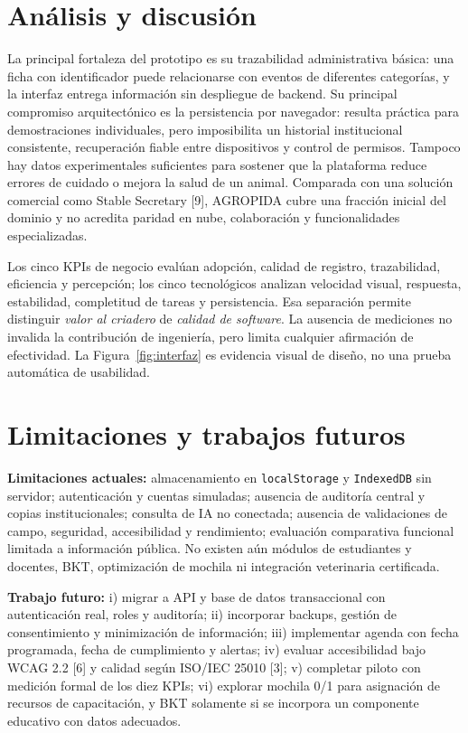 \documentclass[conference,10pt]{IEEEtran}
\begin{document}
\section{Análisis y discusión}
La principal fortaleza del prototipo es su trazabilidad administrativa básica: una ficha con identificador puede relacionarse con eventos de diferentes categorías, y la interfaz entrega información sin despliegue de backend. Su principal compromiso arquitectónico es la persistencia por navegador: resulta práctica para demostraciones individuales, pero imposibilita un historial institucional consistente, recuperación fiable entre dispositivos y control de permisos. Tampoco hay datos experimentales suficientes para sostener que la plataforma reduce errores de cuidado o mejora la salud de un animal. Comparada con una solución comercial como Stable Secretary [9], AGROPIDA cubre una fracción inicial del dominio y no acredita paridad en nube, colaboración y funcionalidades especializadas.

Los cinco KPIs de negocio evalúan adopción, calidad de registro, trazabilidad, eficiencia y percepción; los cinco tecnológicos analizan velocidad visual, respuesta, estabilidad, completitud de tareas y persistencia. Esa separación permite distinguir \emph{valor al criadero} de \emph{calidad de software}. La ausencia de mediciones no invalida la contribución de ingeniería, pero limita cualquier afirmación de efectividad. La Figura~\ref{fig:interfaz} es evidencia visual de diseño, no una prueba automática de usabilidad.

\section{Limitaciones y trabajos futuros}
\textbf{Limitaciones actuales:} almacenamiento en \texttt{localStorage} y \texttt{IndexedDB} sin servidor; autenticación y cuentas simuladas; ausencia de auditoría central y copias institucionales; consulta de IA no conectada; ausencia de validaciones de campo, seguridad, accesibilidad y rendimiento; evaluación comparativa funcional limitada a información pública. No existen aún módulos de estudiantes y docentes, BKT, optimización de mochila ni integración veterinaria certificada.

\textbf{Trabajo futuro:} i) migrar a API y base de datos transaccional con autenticación real, roles y auditoría; ii) incorporar backups, gestión de consentimiento y minimización de información; iii) implementar agenda con fecha programada, fecha de cumplimiento y alertas; iv) evaluar accesibilidad bajo WCAG 2.2 [6] y calidad según ISO/IEC 25010 [3]; v) completar piloto con medición formal de los diez KPIs; vi) explorar mochila 0/1 para asignación de recursos de capacitación, y BKT solamente si se incorpora un componente educativo con datos adecuados.
\end{document}
